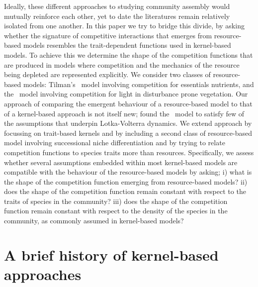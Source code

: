 \documentclass[a4paper,11pt]{article}
\begin{document}
Ideally, these different approaches to studying community assembly
would mutually reinforce each other, yet to date the literatures
remain relatively isolated from one another.
%
In this paper we try to bridge this divide, by asking whether the
signature of competitive interactions that emerges from resource-based
models resembles the trait-dependent functions used in kernel-based
models.
%
To achieve this we determine the shape of the competition functions
that are produced in models where competition and the
mechanics of the resource being depleted are represented explicitly.
We consider two classes of resource-based models: Tilman's
\Rstar\ model involving competition for essentials nutrients,
and the \plant\ model involving competition for light in disturbance prone
vegetation.
%
Our approach of comparing the emergent behaviour of a resource-based
model to that of a kernel-based approach is not itself new;
\citet{Abrams-2008} found the \Rstar\ model to satisfy few of the
assumptions that underpin Lotka-Volterra dynamics.
%
We extend \citeauthor{Abrams-2008} approach by focussing on
trait-based kernels and by including a second class of resource-based
model involving successional niche differentiation and by trying to
relate competition functions to species traits more than resources.
%
Specifically, we assess whether several assumptions embedded within
most kernel-based models are compatible with the behaviour of the
resource-based models by asking;
%
i) what is the shape of the competition function emerging from resource-based
models?
%
ii) does the shape of the competition function remain constant with
respect to the traits of species in the community?
%
iii) does the shape of the competition function remain constant with
respect to the density of the species in the community, as commonly
assumed in kernel-based models?

\section{A brief history of kernel-based approaches}
\end{document}
